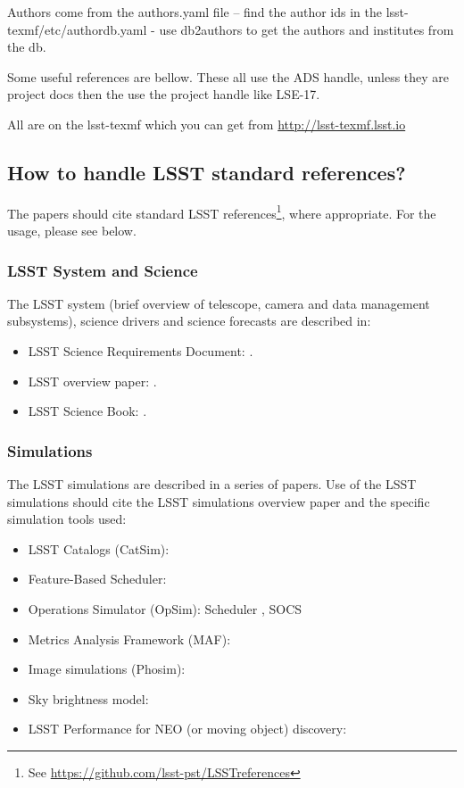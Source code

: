 Authors come from the authors.yaml file --  find the author ids in the lsst-texmf/etc/authordb.yaml - use db2authors to get the authors and institutes from the db. 

Some useful references are bellow.  These all use the ADS handle, unless they are project docs then the use the project handle like LSE-17.

All are on the lsst-texmf which you can get from \url{http://lsst-texmf.lsst.io}


\subsection{How to handle LSST standard references?} 

The papers should cite standard LSST references\footnote{See \url{https://github.com/lsst-pst/LSSTreferences}}, 
where appropriate. For the usage, please see below. 


\subsubsection{LSST System and Science}

The LSST system (brief overview of telescope, camera and data management subsystems),
science drivers and science forecasts are described in:

\begin{itemize}
\item LSST Science Requirements Document: \cite{LPM-17}.
\item LSST overview paper: \cite{2008arXiv0805.2366I}.
\item LSST Science Book: \cite{abell2009lsst}.
\end{itemize}


\subsubsection{Simulations}

The LSST simulations are described in a series of papers. Use of the LSST simulations should cite the LSST simulations overview paper \cite{2014SPIE.9150E..14C} and the specific simulation tools used:

\begin{itemize}
\item LSST Catalogs (CatSim): \cite{2014SPIE.9150E..14C}
\item Feature-Based Scheduler: \cite{2018arXiv181004815N}
\item Operations Simulator (OpSim): Scheduler \cite{2016SPIE.9910E..13D}, SOCS \cite{2016SPIE.9911E..25R}
\item Metrics Analysis Framework (MAF): \cite{2014SPIE.9149E..0BJ}
\item Image simulations (Phosim): \cite{2015ApJS..218...14P}
\item Sky brightness model: \cite{2016SPIE.9910E..1AY}
\item LSST Performance for NEO (or moving object) discovery: \cite{2018Icar..303..181J}
\end{itemize}


